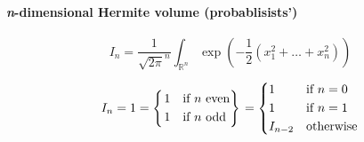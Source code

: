 \documentclass{scrartcl}
\begin{document}
\paragraph{\textit{n}-dimensional Hermite volume (probablisists')}

\[
  I_n = \frac{1}{\sqrt{2\pi}^n} \int_{\mathbb{R}^n} \exp\left(-\frac{1}{2}(x_1^2+\dots+x_n^2)\right)
\]

\[
I_n
= 1
=\begin{dcases}\begin{rcases}
  1&\text{if $n$ even}\\
  1&\text{if $n$ odd}
\end{rcases}
\end{dcases}
   =\begin{dcases}
     1&\text{if $n=0$}\\
     1&\text{if $n=1$}\\
     I_{n-2}&\text{otherwise}
   \end{dcases}
\]
\end{document}
